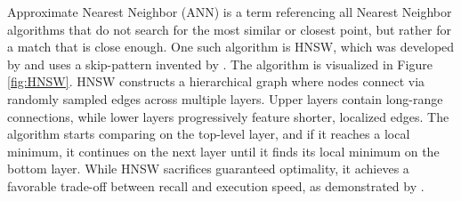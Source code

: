 Approximate Nearest Neighbor (ANN) is a term referencing all Nearest Neighbor algorithms that do not search for the most similar or closest point, but rather for a match that is close enough. One such algorithm is HNSW, which was developed by \cite{Malkov.2014} and uses a skip-pattern invented by \cite{Pugh.1990}. The algorithm is visualized in Figure \ref{fig:HNSW}. HNSW constructs a hierarchical graph where nodes connect via randomly sampled edges across multiple layers. Upper layers contain long-range connections, while lower layers progressively feature shorter, localized edges. The algorithm starts comparing on the top-level layer, and if it reaches a local minimum, it continues on the next layer until it finds its local minimum on the bottom layer. While HNSW sacrifices guaranteed optimality, it achieves a favorable trade-off between recall and execution speed, as demonstrated by \cite{ErikBernhardsson.22.01.2025}.
